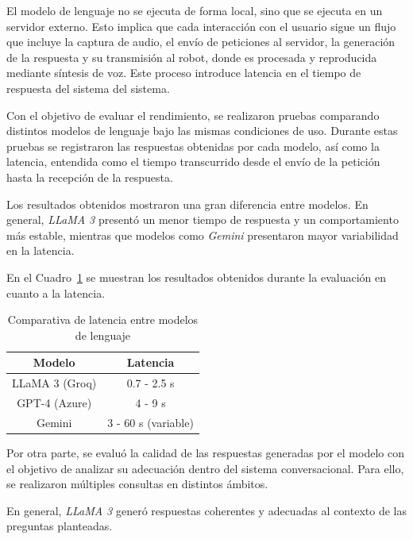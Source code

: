 \vspace{0.2cm}

El modelo de lenguaje no se ejecuta de forma local, sino que se ejecuta en un servidor externo. Esto implica que cada interacción con el usuario sigue un flujo que incluye la captura de audio, el envío de peticiones al servidor, la generación de la respuesta y su transmisión al robot, donde es procesada y reproducida mediante síntesis de voz. Este proceso introduce latencia en el tiempo de respuesta del sistema del sistema.

\vspace{0.2cm}

Con el objetivo de evaluar el rendimiento, se realizaron pruebas comparando distintos modelos de lenguaje bajo las mismas condiciones de uso. Durante estas pruebas se registraron las respuestas obtenidas por cada modelo, así como la latencia, entendida como el tiempo transcurrido desde el envío de la petición hasta la recepción de la respuesta.

Los resultados obtenidos mostraron una gran diferencia entre modelos. En general, \textit{LLaMA 3} presentó un menor tiempo de respuesta y un comportamiento más estable, mientras que modelos como \textit{Gemini} presentaron mayor variabilidad en la latencia.


En el Cuadro~\ref{tab:llm_latency} se muestran los resultados obtenidos durante la evaluación en cuanto a la latencia.

\begin{table}[H]
\begin{center}
\begin{tabular}{|c|c|}
\hline
\textbf{Modelo} & \textbf{Latencia} \\
\hline
LLaMA 3 (Groq) & 0.7 - 2.5 s \\
\hline
GPT-4 (Azure) & 4 - 9 s \\
\hline
Gemini & 3 - 60 s (variable) \\
\hline
\end{tabular}
\caption{Comparativa de latencia entre modelos de lenguaje}
\label{tab:llm_latency}
\end{center}
\end{table}

Por otra parte, se evaluó la calidad de las respuestas generadas por el modelo con el objetivo de analizar su adecuación dentro del sistema conversacional. Para ello, se realizaron múltiples consultas en distintos ámbitos.

En general, \textit{LLaMA 3} generó respuestas coherentes y adecuadas al contexto de las preguntas planteadas.

